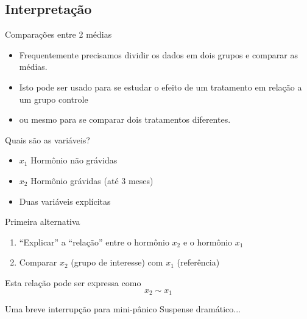 \documentclass{beamer}
\begin{document}
\subsection{Interpretação}

\begin{frame}{Comparações entre 2 médias}
  \begin{itemize}
  \item Frequentemente precisamos dividir os dados em dois grupos e
    comparar as médias.

    \bigskip
  \item Isto pode ser usado para se estudar o efeito de um tratamento
    em relação a um grupo controle

    \bigskip
  \item ou mesmo para se comparar dois tratamentos diferentes.
  \end{itemize}
\end{frame}


\begin{frame}{Quais são as variáveis?}
  \begin{itemize}
  \item $x_1$ Hormônio não grávidas
  \item $x_2$ Hormônio grávidas (até 3 meses)
  \item Duas variáveis explícitas
  \end{itemize}
  \begin{block}{Primeira alternativa}
    \small
    \begin{enumerate}
    \item``Explicar'' a ``relação'' entre o hormônio $x_2$ e o hormônio $x_1$%
    \item Comparar $x_2$ (grupo de interesse) com $x_1$ (referência)%
    \end{enumerate}
  \end{block}
  \begin{block}{Esta relação pode ser expressa como}
    \begin{displaymath}
      x_2 \sim x _1
    \end{displaymath}
  \end{block}
\end{frame}

\begin{frame}{Uma breve interrupção para mini-pânico}
  \vfill
  \vfill
  \vfill
  \vfill
  \vfill
  \hfill \small Suspense dramático...
\end{frame}
\end{document}
